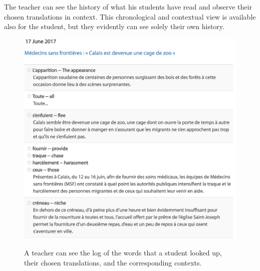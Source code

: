 The teacher can see the history of what his students have read and observe their chosen translations in context. This chronological and contextual view is available also for the student, but they evidently can see solely their own history.

\begin{figure}[h!]
\centering
  \includegraphics[width=\columnwidth]{figures/teacher_dashboard.png}
  \caption{A teacher can see the log of the words that a student looked up, their chosen translations, and the corresponding contexts.}{
  \label{exercise_translate}
  }
\end{figure}




